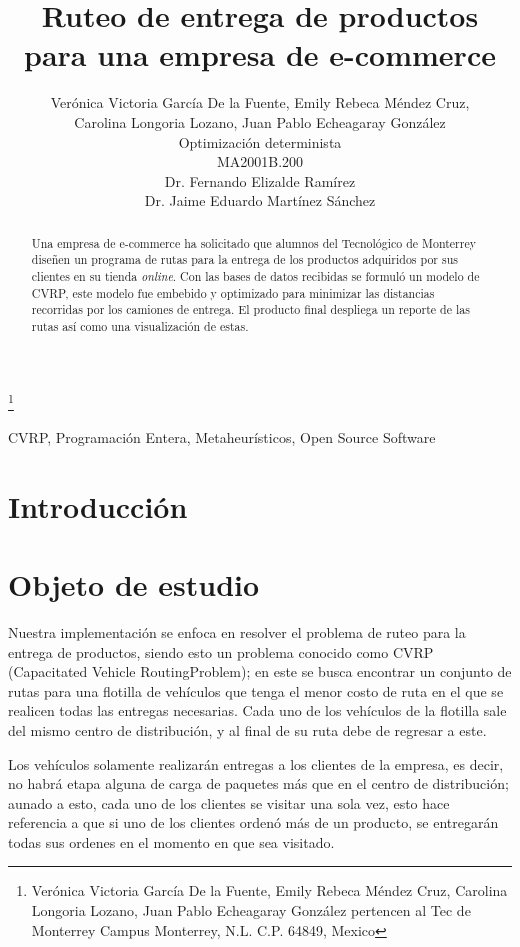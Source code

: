 \documentclass[journal]{IEEEtran}
\title{\LARGE \bf Ruteo de entrega de productos para una empresa de e-commerce}
\author{Verónica Victoria García De la Fuente, Emily Rebeca Méndez Cruz, \\Carolina Longoria Lozano, Juan Pablo Echeagaray González \\
Optimización determinista \\
MA2001B.200 \\
Dr. Fernando Elizalde Ramírez \\
Dr. Jaime Eduardo Martínez Sánchez}%
\begin{document}
    \thanks{Verónica Victoria García De la Fuente, Emily Rebeca Méndez Cruz, Carolina Longoria Lozano, Juan Pablo Echeagaray González pertencen al Tec de Monterrey Campus Monterrey, N.L. C.P. 64849, Mexico {\tt\small}}

    \maketitle

    \thispagestyle{empty}
    \pagestyle{empty}

    \begin{abstract}
        Una empresa de e-commerce ha solicitado que alumnos del Tecnológico de Monterrey diseñen un programa de rutas para la entrega de los productos adquiridos por sus clientes en su tienda \emph{online}. Con las bases de datos recibidas se formuló un modelo de CVRP, este modelo fue embebido y optimizado para minimizar las distancias recorridas por los camiones de entrega. El producto final despliega un reporte de las rutas así como una visualización de estas.
    \end{abstract}

    \begin{IEEEkeywords} 
        CVRP, Programación Entera, Metaheurísticos, Open Source Software
    \end{IEEEkeywords}

    \section{Introducción} \label{sec:intro} %
        
    \section{Objeto de estudio} \label{sec:case-study}

        Nuestra implementación se enfoca en resolver el problema de ruteo para la entrega de productos, siendo esto un problema conocido como CVRP (Capacitated Vehicle RoutingProblem); en este se busca encontrar un conjunto de rutas para una flotilla de vehículos que tenga el menor costo de ruta en el que se realicen todas las entregas necesarias. Cada uno de los vehículos de la flotilla sale del mismo centro de distribución, y al final de su ruta debe de regresar a este.

        Los vehículos solamente realizarán entregas a los clientes de la empresa, es decir, no habrá etapa alguna de carga de paquetes más que en el centro de distribución; aunado a esto, cada uno de los clientes se visitar una sola vez, esto hace referencia a que si uno de los clientes ordenó más de un producto, se entregarán todas sus ordenes en el momento en que sea visitado.
        
\end{document}
